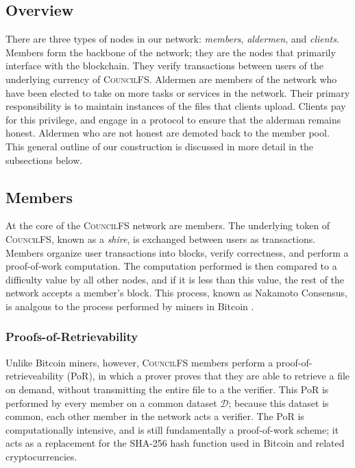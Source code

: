 \documentclass{article}
\begin{document}
\subsection{Overview}

There are three types of nodes in our network: \emph{members}, \emph{aldermen},
and \emph{clients}. Members form the backbone of the network; they are the nodes
that primarily interface with the blockchain. They verify transactions between
users of the underlying currency of \textsc{CouncilFS}. Aldermen are members of the
network who have been elected to take on more tasks or services in the network.
Their primary responsibility is to maintain instances of the files that clients
upload. Clients pay for this privilege, and engage in a protocol to ensure that
the alderman remains honest. Aldermen who are not honest are demoted back to the
member pool. This general outline of our construction is discussed in more
detail in the subsections below.

\subsection{Members}

At the core of the \textsc{CouncilFS} network are members. The underlying token
of \textsc{CouncilFS}, known as a \emph{shire}, is exchanged between users as
transactions. Members organize user transactions into blocks, verify
correctness, and perform a proof-of-work computation. The computation performed
is then compared to a difficulty value by all other nodes, and if it is less
than this value, the rest of the network accepts a member's block. This process,
known as Nakamoto Consensus, is analgous to the process performed by miners in
Bitcoin \cite{btc}.

\subsubsection{Proofs-of-Retrievability}

Unlike Bitcoin miners, however, \textsc{CouncilFS} members perform a
proof-of-retrieveability (PoR), in which a prover proves that they are able to
retrieve a file on demand, without transmitting the entire file to a the
verifier. This PoR is performed by every member on a common dataset
$\mathcal{D}$; because this dataset is common, each other member in the network
acts a verifier. The PoR is computationally intensive, and is still
fundamentally a proof-of-work scheme; it acts as a replacement for the SHA-256
hash function used in Bitcoin and related cryptocurrencies.
\end{document}
